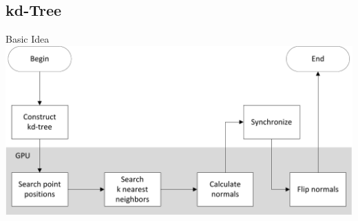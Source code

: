 \documentclass{beamer}
\begin{document}
\subsection*{kd-Tree}

\begin{frame}{Basic Idea}
	\centering
	\includegraphics[width=1.0\textwidth]{kdtree_procedure.pdf}
\end{frame}
\end{document}
